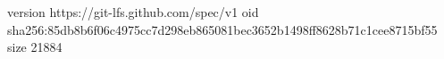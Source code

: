version https://git-lfs.github.com/spec/v1
oid sha256:85db8b6f06c4975cc7d298eb865081bec3652b1498ff8628b71c1cee8715bf55
size 21884
